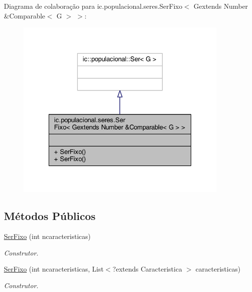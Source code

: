 Diagrama de colaboração para ic.\-populacional.\-seres.\-Ser\-Fixo$<$ Gextends Number \&Comparable$<$ G $>$ $>$\-:\nopagebreak
\begin{figure}[H]
\begin{center}
\leavevmode
\includegraphics[width=298pt]{classic_1_1populacional_1_1seres_1_1_ser_fixo_3_01_gextends_01_number_01_6_comparable_3_01_g_01_4_01_4__coll__graph}
\end{center}
\end{figure}
\subsection*{Métodos Públicos}
\begin{DoxyCompactItemize}
\item 
\hyperlink{classic_1_1populacional_1_1seres_1_1_ser_fixo_3_01_gextends_01_number_01_6_comparable_3_01_g_01_4_01_4_a84cbd706695e3ff2fa47483980226cf0}{Ser\-Fixo} (int ncaracteristicas)
\begin{DoxyCompactList}\small\item\em Construtor. \end{DoxyCompactList}\item 
\hyperlink{classic_1_1populacional_1_1seres_1_1_ser_fixo_3_01_gextends_01_number_01_6_comparable_3_01_g_01_4_01_4_a58c480b999876c71e8c968df9c9063ca}{Ser\-Fixo} (int ncaracteristicas, List$<$?extends Caracteristica $>$ caracteristicas)
\begin{DoxyCompactList}\small\item\em Construtor. \end{DoxyCompactList}\end{DoxyCompactItemize}


